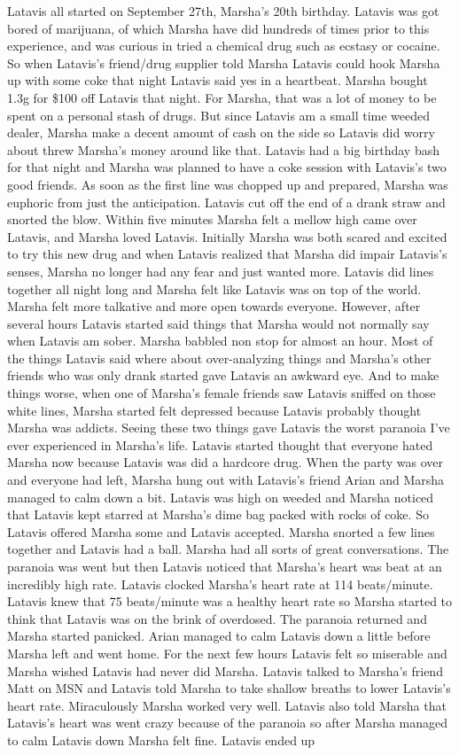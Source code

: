 \documentclass[12pt]{book}
\begin{document}
Latavis all started on September 27th, Marsha's 20th birthday. Latavis was got bored of marijuana, of which Marsha have did hundreds of times prior to this experience, and was curious in tried a chemical drug such as ecstasy or cocaine. So when Latavis's friend/drug supplier told Marsha Latavis could hook Marsha up with some coke that night Latavis said yes in a heartbeat. Marsha bought 1.3g for \$100 off Latavis that night. For Marsha, that was a lot of money to be spent on a personal stash of drugs. But since Latavis am a small time weeded dealer, Marsha make a decent amount of cash on the side so Latavis did worry about threw Marsha's money around like that. Latavis had a big birthday bash for that night and Marsha was planned to have a coke session with Latavis's two good friends. As soon as the first line was chopped up and prepared, Marsha was euphoric from just the anticipation. Latavis cut off the end of a drank straw and snorted the blow. Within five minutes Marsha felt a mellow high came over Latavis, and Marsha loved Latavis. Initially Marsha was both scared and excited to try this new drug and when Latavis realized that Marsha did impair Latavis's senses, Marsha no longer had any fear and just wanted more. Latavis did lines together all night long and Marsha felt like Latavis was on top of the world. Marsha felt more talkative and more open towards everyone. However, after several hours Latavis started said things that Marsha would not normally say when Latavis am sober. Marsha babbled non stop for almost an hour. Most of the things Latavis said where about over-analyzing things and Marsha's other friends who was only drank started gave Latavis an awkward eye. And to make things worse, when one of Marsha's female friends saw Latavis sniffed on those white lines, Marsha started felt depressed because Latavis probably thought Marsha was addicts. Seeing these two things gave Latavis the worst paranoia I've ever experienced in Marsha's life. Latavis started thought that everyone hated Marsha now because Latavis was did a hardcore drug. When the party was over and everyone had left, Marsha hung out with Latavis's friend Arian and Marsha managed to calm down a bit. Latavis was high on weeded and Marsha noticed that Latavis kept starred at Marsha's dime bag packed with rocks of coke. So Latavis offered Marsha some and Latavis accepted. Marsha snorted a few lines together and Latavis had a ball. Marsha had all sorts of great conversations. The paranoia was went but then Latavis noticed that Marsha's heart was beat at an incredibly high rate. Latavis clocked Marsha's heart rate at 114 beats/minute. Latavis knew that 75 beats/minute was a healthy heart rate so Marsha started to think that Latavis was on the brink of overdosed. The paranoia returned and Marsha started panicked. Arian managed to calm Latavis down a little before Marsha left and went home. For the next few hours Latavis felt so miserable and Marsha wished Latavis had never did Marsha. Latavis talked to Marsha's friend Matt on MSN and Latavis told Marsha to take shallow breaths to lower Latavis's heart rate. Miraculously Marsha worked very well. Latavis also told Marsha that Latavis's heart was went crazy because of the paranoia so after Marsha managed to calm Latavis down Marsha felt fine. Latavis ended up 
\end{document}
